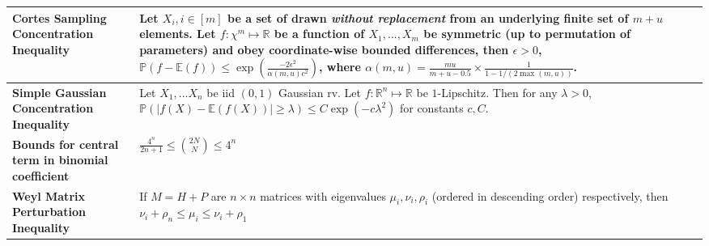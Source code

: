 \documentclass[11pt]{article}
\begin{document}
\begin{tabular}{|>{\raggedright}m{4.5cm}|m{13cm}|}
\textbf{Cortes Sampling Concentration Inequality} & Let $X_i, i \in [m]$ be a set of drawn \textit{without replacement} from an underlying finite set of $m+u$ elements. Let $f: \chi^m \mapsto \mathbb{R}$ be a function of $X_1,...,X_m$ be symmetric (up to permutation of parameters) and obey coordinate-wise bounded differences, then $\epsilon>0$, $\mathbb{P}(f - \mathbb{E}(f)) \leq \exp\left(  \frac{-2\epsilon^2}{\alpha(m,u)c^2} \right)$, where $\alpha(m,u)=\frac{mu}{m+u-0.5} \times \frac{1}{1-1/(2\max(m,u))}$.\\ \hline
\textbf{Simple Gaussian Concentration Inequality} & Let $X_1,...X_n$ be iid $(0,1)$ Gaussian rv. Let $f:\mathbb{R}^n \mapsto \mathbb{R}$ be $1$-Lipschitz. Then for any $\lambda >0$, $\mathbb{P}(|f(X) - \mathbb{E}(f(X))| \geq \lambda) \leq C\exp(-c\lambda^2)$ for constants $c, C$.\\ \hline
\textbf{Bounds for central term in binomial coefficient} & $\frac{4^n}{2n+1} \leq \binom{2N}{N} \leq 4^n$\\ \hline
\textbf{Weyl Matrix Perturbation Inequality} & If $M=H+P$ are $n \times n$ matrices with eigenvalues $\mu_i, \nu_i, \rho_i$ (ordered in descending order) respectively, then $\nu_i + \rho_n \leq \mu_i \leq \nu_i + \rho_1$\\ \hline
\end{tabular}
\end{document}
